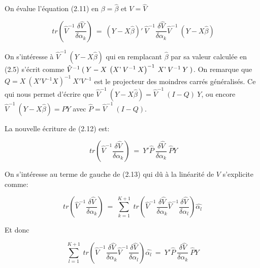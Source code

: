\documentclass[11pt,fleqn]{book} %
\begin{document}
	On évalue l'équation \:(2.11)\:\: en \:\: $\beta=\hat{\beta}$ \:\:et\:\: $V=\hat{V}$ 
	
	\begin{equation}
		\: tr\left( \hat{V}^{-1} \frac{ \delta \hat{V} }{\delta \alpha_k} \right)  \:=\: (Y-X\hat{\beta})'\:\hat{V}^{-1} \frac{ \delta \hat{V} }{\delta \alpha_k} \hat{V}^{-1}\:(Y-X\hat{\beta}) 
	\end{equation}
	
	\vspace{1em}
	
	On s'intéresse à $\hat{V}^{-1}\:(Y-X\hat{\beta})$ qui en remplacant $\hat{\beta}$ par sa valeur calculée en (2.5) s'écrit comme $\hat{V}^{-1}\:(\: Y-X\:\left(  X\textnormal{'}\:V^{-1} \: X \right)^{-1} \: X\textnormal{'} \:V^{-1}\: Y \:)$. On remarque que $Q=X\:(X'V^{-1}X)^{-1}\:X' V^{-1}$ est le projecteur des moindres carrés généralisés. Ce qui nous permet d'écrire que $\hat{V}^{-1}\:(Y-X\hat{\beta})=\hat{V}^{-1}\:(I-Q)\:Y $, ou encore $\hat{V}^{-1}\:(Y-X\hat{\beta})=\hat{P}Y$ avec $\hat{P}=\hat{V}^{-1}\:(I-Q)$.
	
	\vspace{1em}
	
	La nouvelle écriture de (2.12) est:
	
	\begin{equation}
		\: tr\left( \hat{V}^{-1} \frac{ \delta \hat{V} }{\delta \alpha_k} \right)  \:=\: Y'\hat{P}\:\frac{ \delta \hat{V} }{\delta \alpha_k}\: \hat{P} Y
	\end{equation}
	
	\vspace{1em}
	
	On s'intéresse au terme de gauche de (2.13) qui dû à la linéarité de $V$ s'explicite comme:
	
	\begin{equation*}
		tr\left( \hat{V}^{-1} \frac{ \delta \hat{V} }{\delta \alpha_k} \right) \:=\: \sum_{k=1}^{K+1} \: tr\left(\hat{V}^{-1} \frac{ \delta \hat{V} }{\delta \alpha_k}  \hat{V}^{-1} \frac{ \delta \hat{V} }{\delta \alpha_l}\right) \hat{\alpha_l}
	\end{equation*}
	
	\vspace{1em}
	
	Et donc
	
	\begin{equation*}
		\sum_{l=1}^{K+1} \: tr\left(\hat{V}^{-1} \frac{ \delta \hat{V} }{\delta \alpha_k}  \hat{V}^{-1} \frac{ \delta \hat{V} }{\delta \alpha_l}\right) \hat{\alpha_l} \:=\: Y'\hat{P}\:\frac{ \delta \hat{V} }{\delta \alpha_k}\: \hat{P} Y
	\end{equation*}
	
\end{document}
